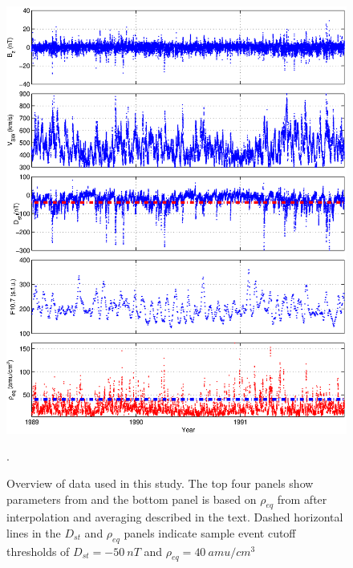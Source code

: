 \documentclass[10pt,twocolumn]{article}
\begin{document}
\begin{figure}[htp]
\centering
\includegraphics[scale=0.45]{paperfigures/alldata.eps}
\caption{Overview of data used in this study. The top four panels show parameters from \cite{Reconstruction} and the bottom panel is based on $\rho_{eq}$ from \cite{Denton} after interpolation and averaging described in the text. Dashed horizontal lines in the $D_{st}$ and $\rho_{eq}$ panels indicate sample event cutoff thresholds of $D_{st}=-50~nT$ and $\rho_{eq}=40~amu/cm^3$}.
\label{AllData}
\end{figure}
\end{document}
